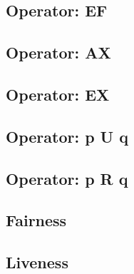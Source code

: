 \documentclass{article}%
\begin{document}
\subsection{Operator: EF}
\subsection{Operator: AX}
\subsection{Operator: EX}
\subsection{Operator: p U q}
\subsection{Operator: p R q}
\subsection{Fairness}
\subsection{Liveness}
\newpage

\newpage


\end{document}
